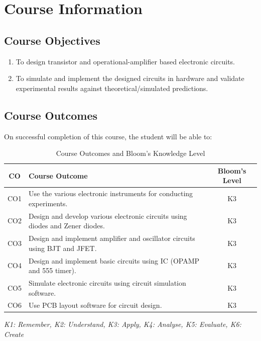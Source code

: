 \chapter*{Course Information}
\section*{Course Objectives}
\begin{enumerate}[label=\arabic*.]
	\item To design transistor and operational-amplifier based electronic circuits.
	\item To simulate and implement the designed circuits in hardware and validate experimental results against theoretical/simulated predictions.
\end{enumerate}

\section*{Course Outcomes}
On successful completion of this course, the student will be able to:
\begin{table}[H]
	\centering
	\renewcommand{\arraystretch}{1.4}
	\begin{tabular}{cp{11cm}c}
		\toprule
		\textbf{CO} & \textbf{Course Outcome} & \textbf{Bloom's Level} \\
		\midrule
		CO1 & Use the various electronic instruments for conducting experiments. & K3 \\
		
		CO2 & Design and develop various electronic circuits using diodes and Zener diodes. & K3 \\
		
		CO3 & Design and implement amplifier and oscillator circuits using BJT and JFET. & K3 \\
		
		CO4 & Design and implement basic circuits using IC (OPAMP and 555 timer). & K3 \\
		
		CO5 & Simulate electronic circuits using circuit simulation software. & K3 \\
		
		CO6 & Use PCB layout software for circuit design. & K3 \\
		\bottomrule
	\end{tabular}
	\caption{Course Outcomes and Bloom's Knowledge Level}
\end{table}
\textit{K1: Remember, K2: Understand, K3: Apply, K4: Analyse, K5: Evaluate, K6: Create}

